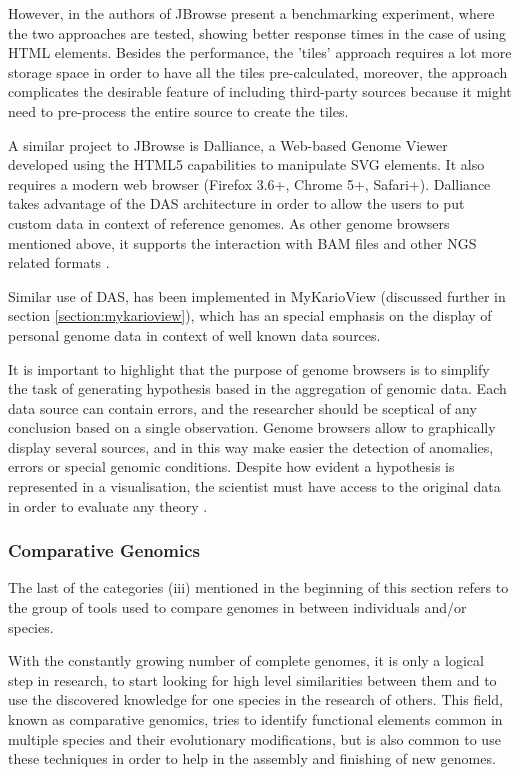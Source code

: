 However, in \cite{SKI2009} the authors of JBrowse present a benchmarking experiment, where the two approaches are tested, showing better response times in the case of using HTML elements. Besides the performance, the 'tiles' approach requires a lot more storage space in order to have all the tiles pre-calculated, moreover, the approach complicates the desirable feature of including third-party sources because it might need to pre-process the entire source to create the tiles.

A similar project to JBrowse is Dalliance, a Web-based Genome Viewer developed using the HTML5 capabilities to manipulate SVG elements. It also requires a modern web browser (Firefox 3.6+, Chrome 5+, Safari+). Dalliance takes advantage of the DAS architecture in order to allow the users to put custom data in context of reference genomes. As other genome browsers mentioned above, it supports the interaction with BAM files and other NGS related formats \cite{DOW2011}. 

Similar use of DAS, has been implemented in MyKarioView (discussed further in section \ref{section:mykarioview}), which has an special emphasis on the display of personal genome data in context of well known data sources.

It is important to highlight that the purpose of genome browsers is to simplify the task of generating hypothesis based in the aggregation of genomic data. Each data source can contain errors, and the researcher should be sceptical of any conclusion based on a single observation. Genome browsers allow to graphically display several sources, and in this way make easier the detection of anomalies, errors or special genomic conditions. Despite how evident a hypothesis is represented in a visualisation, the scientist must have access to the original data in order to evaluate any theory \cite{CLI2009}.

\subsubsection{Comparative Genomics}
The last of the categories (iii) mentioned in the beginning of this section refers to the group of tools used to compare genomes in between individuals and/or species.

With the constantly growing number of complete genomes, it is only a logical step in research, to start looking for high level similarities between them and to use the discovered knowledge for one species in the research of others. This field, known as comparative genomics, tries to identify functional elements common in multiple species and their evolutionary modifications, but is also common to use these techniques in order to help in the assembly and finishing of new genomes.

